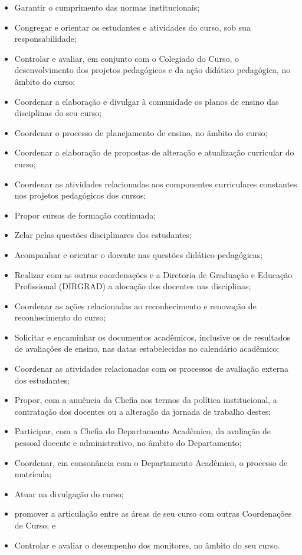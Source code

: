 \begin{itemize}
    \item Garantir o cumprimento das normas institucionais;
    \item Congregar e orientar os estudantes e atividades do curso, sob sua responsabilidade;
    \item Controlar e avaliar, em conjunto com o Colegiado do Curso, o desenvolvimento dos projetos pedagógicos e da ação didático pedagógica, no âmbito do curso;
    \item Coordenar a elaboração e divulgar à comunidade os planos de ensino das disciplinas do seu curso;
    \item Coordenar o processo de planejamento de ensino, no âmbito do curso;
    \item Coordenar a elaboração de propostas de alteração e atualização curricular do curso;
    \item Coordenar as atividades relacionadas aos componentes curriculares constantes nos projetos pedagógicos dos cursos;
    \item Propor cursos de formação continuada;
    \item Zelar pelas questões disciplinares dos estudantes;
    \item Acompanhar e orientar o docente nas questões didático-pedagógicas;
    \item Realizar com as outras coordenações e a Diretoria de Graduação e Educação Profissional (DIRGRAD) a alocação dos docentes nas disciplinas;
    \item Coordenar as ações relacionadas ao reconhecimento e renovação de reconhecimento do curso;
    \item Solicitar e encaminhar os documentos acadêmicos, inclusive os de resultados de avaliações de ensino, nas datas estabelecidas no calendário acadêmico;
    \item Coordenar as atividades relacionadas com os processos de avaliação externa dos estudantes;
    \item Propor, com a anuência da Chefia nos termos da política institucional, a contratação dos docentes ou a alteração da jornada de trabalho destes;
    \item Participar, com a Chefia do Departamento Acadêmico, da avaliação de pessoal docente e administrativo, no âmbito do Departamento;
    \item Coordenar, em consonância com o Departamento Acadêmico, o processo de matrícula;
    \item Atuar na divulgação do curso; 
    \item promover a articulação entre as áreas de seu curso com outras Coordenações de Curso; e
    \item Controlar e avaliar o desempenho dos monitores, no âmbito do seu curso.
\end{itemize}

